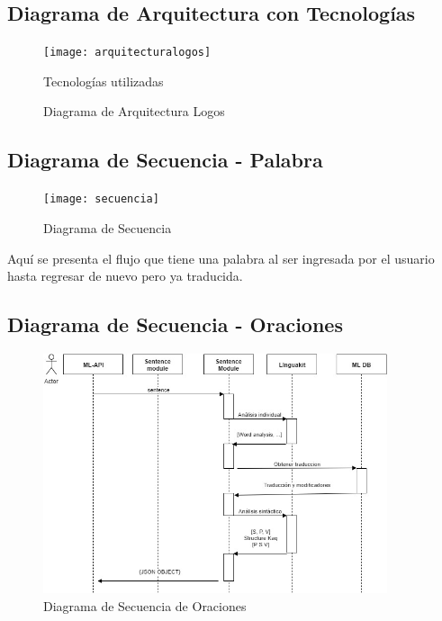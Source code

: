 \documentclass[a4paper,openright,11pt]{article}
\begin{document}
\subsection{Diagrama de Arquitectura con Tecnologías}
\begin{figure}[H]
	\centering
	\texttt{[image: arquitecturalogos]}
	\caption{Diagrama de Arquitectura Logos} 
	Tecnologías utilizadas
	\label{fig:arqL}
\end{figure}

\subsection{Diagrama de Secuencia - Palabra}
\begin{figure}[h]
	\centering
	\texttt{[image: secuencia]}
	\caption{Diagrama de Secuencia}
	\label{fig:sec}
\end{figure}
Aquí se presenta el flujo que tiene una palabra al ser ingresada por el usuario hasta regresar de nuevo pero ya traducida.

\subsection{Diagrama de Secuencia - Oraciones}
\begin{figure}[H]
	\centering
	\includegraphics[width=0.9\textwidth]{secuenciaoracion}
	\caption{Diagrama de Secuencia de Oraciones}
	\label{fig:seco}
\end{figure}
\end{document}
